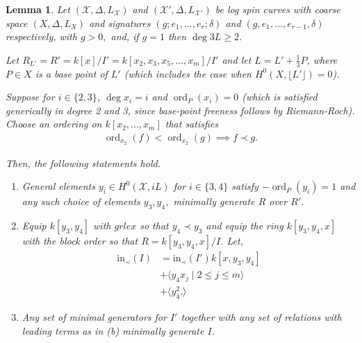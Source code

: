 \documentclass{amsart}
\theoremstyle{plain}
\newtheorem{lem}[thm]{Lemma}
\theoremstyle{definition}
\theoremstyle{remark}
\numberwithin{equation}{section}
\newcommand \sx{\mathscr X}
\DeclareMathOperator{\ord}{ord}
\newcommand \halfcan{L}
\newcommand \initial{\text{in}}
\begin{document}
\begin{lem}
\label{lem:sat-two-induction-high-genus}
Let $(\sx, \Delta, \halfcan_\sx)$ and $(\sx', \Delta, \halfcan_{\sx'})$ be log spin curves with coarse space $(X, \Delta, L_X)$ and signatures $(g; e_1, \ldots, e_r; \delta)$ and $(g, e_1, \ldots, e_{r- 1}, \delta)$ respectively, with $g > 0,$ and, if $g = 1$ then $\deg 3L \geq 2$.

Let $R_{L'} = R' = k[x]/I'= k[x_2, x_3
, x_5, \ldots, x_m]/I'$ and let $\halfcan = \halfcan' + \frac{1}{
3}P$, where $P\in X$ is a base point of $\halfcan'$ (which includes the case when $H^0(X, \lfloor \halfcan'\rfloor) = 0$).

Suppose for $i \in \{2, 3\}$, $\deg x_i = i$ and $\ord_P(x_i)= 0$ (which is satisfied generically in degree 2 and 3, since base-point freeness follows by Riemann-Roch). Choose an ordering on $k[x_2, \ldots, x_m]$ that satisfies
\begin{align*}
	\ord_{x_2}(f) < \ord_{x_2}(g) \implies f \prec g.
\end{align*}

\noindent
Then, the following statements hold.

\begin{enumerate}
	\item[(a)] General elements  $y_i \in H^0(\sx,iL)$ for $i \in
		\{3, 4\}$ satisfy $-\ord_P(y_i) = 1$ and any such choice of elements
		$y_3, y_4,$ minimally generate $R$ over $R'$.
	\item[(b)] Equip $k[y_3, y_4]$ with $grlex$ so that $y_4 \prec 
		y_3$
		and equip the ring $k[y_3, y_4, x]$ with the block 
		order so that $R = k[y_3, y_4, x]/I$. Let,
		\begin{align*}
			\initial_\prec(I) &= \initial_\prec(I')k[x, y_3, y_4] \\
			&+\langle y_4 x_j \mid 2 \leq j \leq m \rangle \\
			&+\langle y_4^2.\rangle
		\end{align*}
	\item[(c)] Any set of minimal generators for $I'$ together with 
		any set of relations with leading terms as in (b) minimally 
		generate $I$.
\end{enumerate}
\end{lem}
\end{document}
